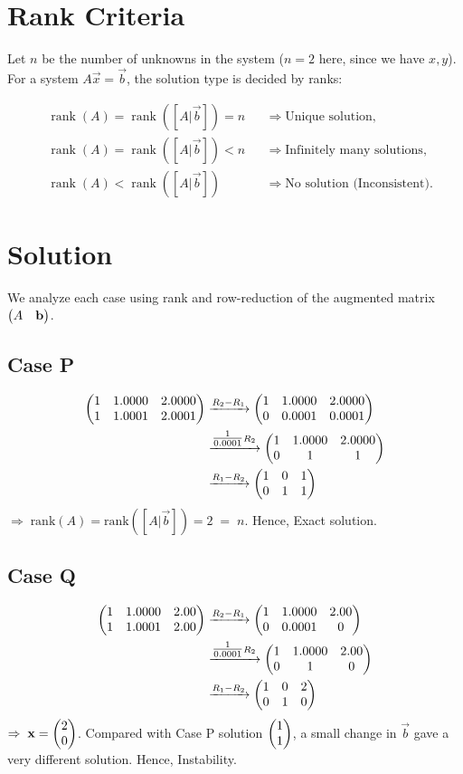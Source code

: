 \documentclass[12pt]{article}
\begin{document}
\section*{Rank Criteria}

Let $n$ be the number of unknowns in the system 
($n=2$ here, since we have $x,y$).  
For a system $A\vec{x}=\vec{b}$, the solution type is decided by ranks:

\[
\begin{aligned}
&\operatorname{rank}(A)=\operatorname{rank}([A|\vec{b}])=n 
&&\Rightarrow \text{Unique solution}, \\[6pt]
&\operatorname{rank}(A)=\operatorname{rank}([A|\vec{b}])<n 
&&\Rightarrow \text{Infinitely many solutions}, \\[6pt]
&\operatorname{rank}(A)<\operatorname{rank}([A|\vec{b}]) 
&&\Rightarrow \text{No solution (Inconsistent)}.
\end{aligned}
\]

\section*{Solution}

We analyze each case using rank and row-reduction of the augmented matrix 
$\begin{pmatrix}A & \mathbf{b}\end{pmatrix}$.

\subsection*{Case P}
\begin{align}
\begin{pmatrix}1 & 1.0000 & 2.0000 \\ 1 & 1.0001 & 2.0001\end{pmatrix}
&\xrightarrow{R_2 - R_1}
\begin{pmatrix}1 & 1.0000 & 2.0000 \\ 0 & 0.0001 & 0.0001\end{pmatrix} \\
&\xrightarrow{\tfrac{1}{0.0001}R_2}
\begin{pmatrix}1 & 1.0000 & 2.0000 \\ 0 & 1 & 1\end{pmatrix} \\
&\xrightarrow{R_1 - R_2}
\begin{pmatrix}1 & 0 & 1 \\ 0 & 1 & 1\end{pmatrix}
\end{align}
$\Rightarrow \; \text{rank}(A)=\text{rank}([A|\vec{b}])=2 \;=\; n$.  
Hence, Exact solution.

\subsection*{Case Q}
\begin{align}
\begin{pmatrix}1 & 1.0000 & 2.00 \\ 1 & 1.0001 & 2.00\end{pmatrix}
&\xrightarrow{R_2 - R_1}
\begin{pmatrix}1 & 1.0000 & 2.00 \\ 0 & 0.0001 & 0\end{pmatrix} \\
&\xrightarrow{\tfrac{1}{0.0001}R_2}
\begin{pmatrix}1 & 1.0000 & 2.00 \\ 0 & 1 & 0\end{pmatrix} \\
&\xrightarrow{R_1 - R_2}
\begin{pmatrix}1 & 0 & 2 \\ 0 & 1 & 0\end{pmatrix}
\end{align}
$\Rightarrow \; \mathbf{x}=\begin{pmatrix}2 \\ 0\end{pmatrix}$.  
Compared with Case P solution $\begin{pmatrix}1 \\ 1\end{pmatrix}$, a small change in $\vec{b}$ gave a very different solution.  
Hence, Instability.
\end{document}
